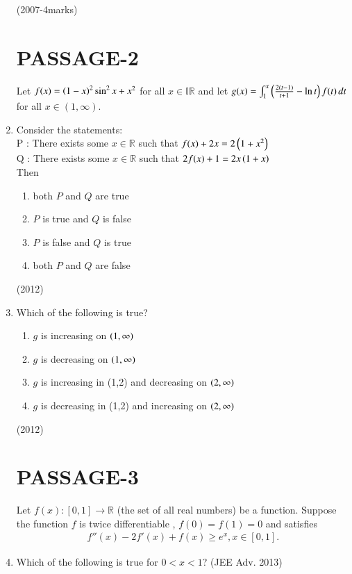 \documentclass[journal,,12pt,twocolumn]{IEEEtran}
\theoremstyle{remark}
\begin{document}
\begin{enumerate}
\hfill {(2007-4marks)}
\section*{PASSAGE-2}
Let $f(x)=\left(1-x\right)^2 \sin^2 x + x^2$ for all $x \in \mathbb{IR}$ and let $g(x)=
\int_{1}^{x} \left(\frac{2(t-1)}{t+1} - \ln t\right)  f(t) \, dt $ for all $x \in (1 ,\infty)$.
\item Consider the statements:\\
P : There exists some $x \in \mathbb{R}$ such that $f(x) + 2x = 2\left(1+x^2\right)$\\
Q : There exists some $x \in\mathbb{R}$ such that $2f(x) + 1 = 2x\left(1+x\right)$\\
    Then
\begin{enumerate}
\item both $P$ and $Q$ are true
\item $P$ is true and $Q$ is false
\item $P$ is false and $Q$ is true
\item both $P$ and $Q$ are false
\end{enumerate}


\hfill{(2012)}
\item Which of the following is true?
\begin{enumerate}

\item $g$ is increasing on $\left(1,\infty\right)$
\item $g$ is decreasing on $\left(1,\infty\right)$
\item $g$ is increasing in (1,2) and decreasing on $\left(2,\infty\right)$
\item $g$ is decreasing in (1,2) and increasing on $\left(2,\infty\right)$

\end{enumerate}
\hfill{(2012)}

\section*{PASSAGE-3}
Let $f(x) : [0,1] \to\mathbb{R}$
(the set of all real numbers) be a function. Suppose the function $f$ is twice differentiable , $f(0)=f(1)=0$ and satisfies \begin{align} f''(x)-2f'(x)+f(x) \geq e^x , x \in [0,1].\end{align} 

\item Which of the following is true for $0<x<1$?
\hfill{(JEE Adv. 2013)}


\end{enumerate}
\end{document}
